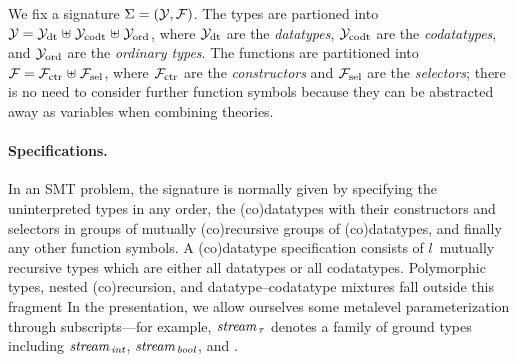 
We fix a signature $\mathrm{\Sigma} = (\mathcal{Y}, \mathcal{F})$. The types are partioned into
$\mathcal{Y} = \mathcal{Y}_{\mathrm{dt}} \mathrel{\uplus} \mathcal{Y}_{\mathrm{codt}} \mathrel{\uplus} \mathcal{Y}_{\mathrm{ord}}$, where $\mathcal{Y}_{\mathrm{dt}}$ are the
\emph{datatypes}, $\mathcal{Y}_{\mathrm{codt}}$ are the \emph{codatatypes}, and $\mathcal{Y}_{\mathrm{ord}}$ are the %
\emph{ordinary types}. The functions are partitioned into $\mathcal{F} = \mathcal{F}_{\mathrm{ctr}}
\mathrel{\uplus} \mathcal{F}_{\mathrm{sel}}$, where $\mathcal{F}_{\mathrm{ctr}}$ are the \emph{constructors} and $\mathcal{F}_{\mathrm{sel}}$ are the
\emph{selectors}; there is no need to consider further function symbols
because they can be abstracted away as variables when combining theories.

\paragraph{Specifications.}
In an SMT problem, the signature is normally given by specifying the
uninterpreted types in any order, the (co)datatypes with their constructors
and selectors in groups of mutually (co)recursive groups of (co)datatypes, and
finally any other function symbols.
%
A (co)datatype specification consists of $l$~mutually recursive types which are
either all datatypes or all codatatypes. Polymorphic types, nested
(co)recursion, and datatype--codatatype mixtures fall outside this fragment%
In the presentation, we allow ourselves some metalevel parameterization
through subscripts---for example, $\textit{stream}_{\,\tau}$ denotes a
family of ground types including
$\textit{stream}_{\,\textit{int}}$, $\textit{stream}_{\,\textit{bool}}$,
and .

